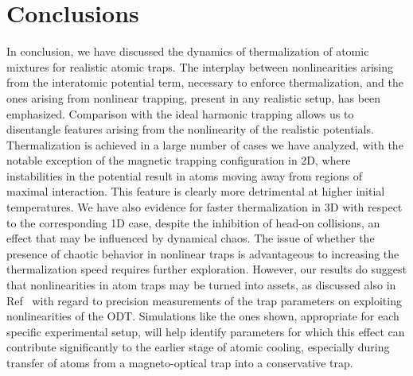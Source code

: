 \documentclass[pra,letterpaper,onecolumn,superscriptaddress,floatfix]{revtex4}
\begin{document}
\section{Conclusions}

In conclusion, we have discussed the dynamics of thermalization of atomic mixtures for realistic atomic traps. 
The interplay between nonlinearities arising from the interatomic potential term, necessary to enforce
thermalization, and the ones arising from nonlinear trapping, present in any realistic setup, has been emphasized. 
Comparison with the ideal harmonic trapping allows us to disentangle
features arising from the nonlinearity of the realistic potentials.
Thermalization is achieved in a large number of cases we have analyzed, with the notable exception of the 
magnetic trapping configuration in 2D, where instabilities in the potential result in atoms moving away from
regions of maximal interaction. This feature is clearly more detrimental at higher initial temperatures. 
We have also evidence for faster thermalization in 3D with respect to the corresponding 1D case, despite the inhibition of 
head-on collisions, an effect that may be influenced by dynamical chaos. 
The issue of whether the presence of chaotic behavior in nonlinear traps is advantageous to increasing the 
thermalization speed requires further exploration. However, our results do suggest that nonlinearities in 
atom traps may be turned into assets, as discussed also in Ref~\cite{Makhalov} with regard to precision 
measurements of the trap parameters on exploiting nonlinearities of the ODT.
Simulations like the ones shown, appropriate for each specific experimental setup, will help
identify parameters for which this effect can contribute significantly to the earlier stage 
of atomic cooling, especially during transfer of atoms from a magneto-optical trap into a conservative trap. 
\end{document}
